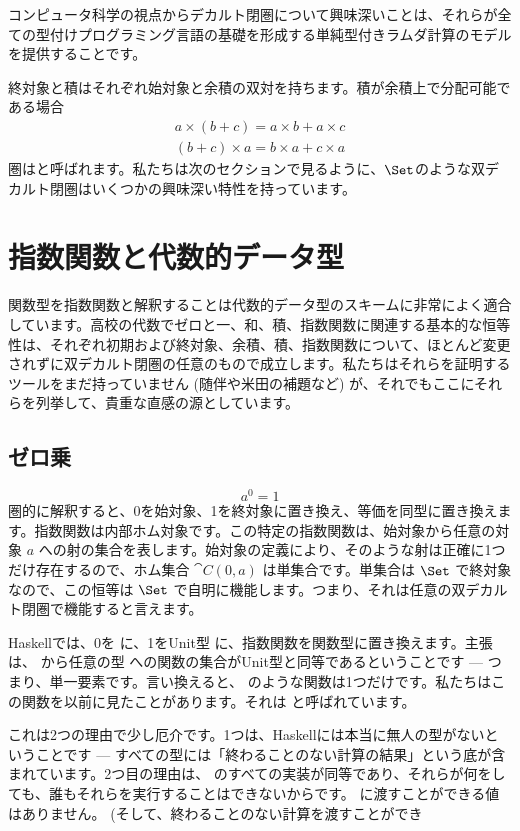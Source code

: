 コンピュータ科学の視点からデカルト閉圏について興味深いことは、それらが全ての型付けプログラミング言語の基礎を形成する単純型付きラムダ計算のモデルを提供することです。

終対象と積はそれぞれ始対象と余積の双対を持ちます。積が余積上で分配可能である場合
\begin{gather*}
  a \times (b + c) = a \times b + a \times c \\
  (b + c) \times a = b \times a + c \times a
\end{gather*}
圏はと呼ばれます。私たちは次のセクションで見るように、$\Set$のような双デカルト閉圏はいくつかの興味深い特性を持っています。

\section{指数関数と代数的データ型}

関数型を指数関数と解釈することは代数的データ型のスキームに非常によく適合しています。高校の代数でゼロと一、和、積、指数関数に関連する基本的な恒等性は、それぞれ初期および終対象、余積、積、指数関数について、ほとんど変更されずに双デカルト閉圏の任意のもので成立します。私たちはそれらを証明するツールをまだ持っていません (随伴や米田の補題など) が、それでもここにそれらを列挙して、貴重な直感の源としています。

\subsection{ゼロ乗}

\[a^{0} = 1\]
圏的に解釈すると、0を始対象、1を終対象に置き換え、等価を同型に置き換えます。指数関数は内部ホム対象です。この特定の指数関数は、始対象から任意の対象 $a$ への射の集合を表します。始対象の定義により、そのような射は正確に1つだけ存在するので、ホム集合 $\cat{C}(0, a)$ は単集合です。単集合は $\Set$ で終対象なので、この恒等は $\Set$ で自明に機能します。つまり、それは任意の双デカルト閉圏で機能すると言えます。

Haskellでは、0を  に、1をUnit型 \code{()} に、指数関数を関数型に置き換えます。主張は、 から任意の型  への関数の集合がUnit型と同等であるということです --- つまり、単一要素です。言い換えると、 のような関数は1つだけです。私たちはこの関数を以前に見たことがあります。それは  と呼ばれています。

これは2つの理由で少し厄介です。1つは、Haskellには本当に無人の型がないということです --- すべての型には「終わることのない計算の結果」という底が含まれています。2つ目の理由は、 のすべての実装が同等であり、それらが何をしても、誰もそれらを実行することはできないからです。  に渡すことができる値はありません。 (そして、終わることのない計算を渡すことができ

